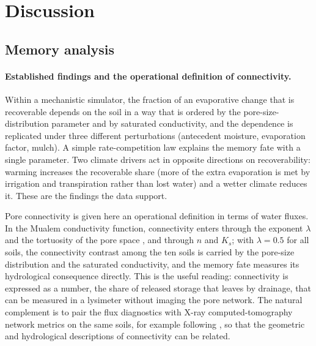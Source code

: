 \section{Discussion}
\subsection{Memory analysis}
\label{sec:disc}
\paragraph{Established findings and the operational definition of connectivity.}
Within a mechanistic simulator, the fraction of an evaporative change that is recoverable depends on the soil in a way that is ordered by the pore-size-distribution parameter and by saturated conductivity, and the dependence is replicated under three different perturbations (antecedent moisture, evaporation factor, mulch). A simple rate-competition law explains the memory fate with a single parameter. Two climate drivers act in opposite directions on recoverability: warming increases the recoverable share (more of the extra evaporation is met by irrigation and transpiration rather than lost water) and a wetter climate reduces it. These are the findings the data support.

Pore connectivity is given here an operational definition in terms of water fluxes. In the Mualem conductivity function, connectivity enters through the exponent $\lambda$ and the tortuosity of the pore space \citep{Mualem1976,Ghanbarian2013}, and through $n$ and $K_s$; with $\lambda=0.5$ for all soils, the connectivity contrast among the ten soils is carried by the pore-size distribution and the saturated conductivity, and the memory fate measures its hydrological consequence directly. This is the useful reading: connectivity is expressed as a number, the share of released storage that leaves by drainage, that can be measured in a lysimeter without imaging the pore network. The natural complement is to pair the flux diagnostics with X-ray computed-tomography network metrics on the same soils, for example following \citet{Leuther2024}, so that the geometric and hydrological descriptions of connectivity can be related.

